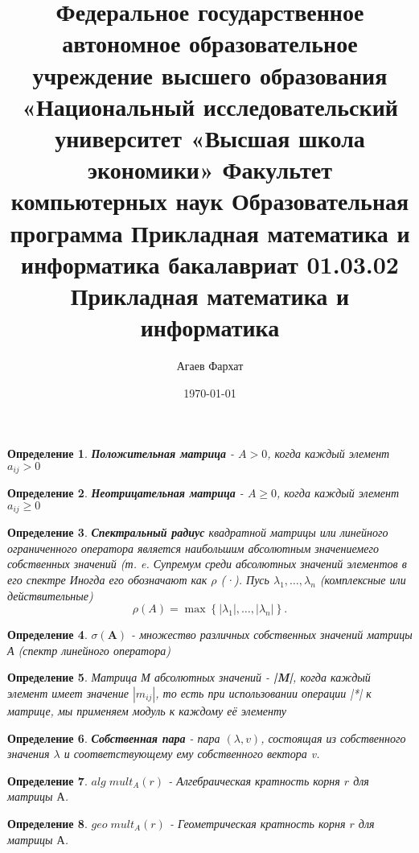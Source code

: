 \documentclass[a4paper,12pt,leqno]{article} %
\author{Агаев Фархат}
\title{Федеральное государственное автономное образовательное учреждение
высшего образования
«Национальный исследовательский университет «Высшая школа экономики»
 Факультет компьютерных наук
Образовательная программа Прикладная математика и информатика
бакалавриат
01.03.02 Прикладная математика и информатика
}
\date{\today}
\newtheorem{definition}{Определение}
\begin{document}

\maketitle

\begin{definition}
    \textbf{Положительная матрица} - $A > 0$, когда каждый элемент $a_{ij} > 0$
\end{definition}

\begin{definition}
    \textbf{Неотрицательная матрица} - $A \geq 0$, когда каждый элемент $a_{ij} \geq 0$
\end{definition}


\begin{definition}
    \textbf{Спектральный радиус} 
    квадратной матрицы или линейного ограниченного оператора 
    является наибольшим абсолютным значениемего собственных значений 
    (т. e. Супремум среди абсолютных значений элементов в его спектре
    Иногда его обозначают как $\rho$ (·).
    Пусь $\lambda_1, \dotsc, \lambda_n $ (комплексные или действительные)
    \[\rho(A) = \max \left \{ |\lambda_1|, \dotsc, |\lambda_n| \right \}.\]
\end{definition}

\begin{definition}
    $\sigma(\textbf{A}) $ - множество различных собственных значений 
    матрицы А (спектр линейного оператора)
\end{definition}

\begin{definition}
    Матрица М абсолютных значений - \textnormal{\textbf{|M|}}, когда каждый элемент
    имеет значение $|m_{ij}|$, то есть при использовании операции \textnormal{|*|} 
    к матрице, мы применяем модуль к каждому её элементу
\end{definition}

\begin{definition}
    \textbf{Собственная пара} - пара $(\lambda, v)$, состоящая из собственного значения $\lambda$
     и соответствующему ему собственного вектора v.
\end{definition}

\begin{definition}
    \textbf{$alg \; mult_A(r)$} - Алгебраическая кратность корня $r$ для матрицы $А$.
\end{definition}

\begin{definition}
    \textbf{$geo \; mult_A(r)$} - Геометрическая кратность корня $r$ для матрицы $А$.
\end{definition}
\end{document}
